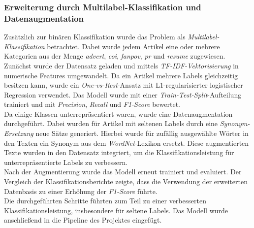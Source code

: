 \subsubsection{Erweiterung durch Multilabel-Klassifikation und Datenaugmentation}
Zusätzlich zur binären Klassifikation wurde das Problem als \textit{Multilabel-Klassifikation} betrachtet. Dabei wurde jedem Artikel eine oder mehrere Kategorien aus der Menge \textit{advert}, \textit{coi}, \textit{fanpov}, \textit{pr} und \textit{resume} zugewiesen. \\
Zunächst wurde der Datensatz geladen und mittels \textit{TF-IDF-Vektorisierung} in numerische Features umgewandelt. Da ein Artikel mehrere Labels gleichzeitig besitzen kann, wurde ein \textit{One-vs-Rest}-Ansatz mit L1-regularisierter logistischer Regression verwendet. Das Modell wurde mit einer \textit{Train-Test-Split}-Aufteilung trainiert und mit \textit{Precision}, \textit{Recall} und \textit{F1-Score} bewertet.\\
Da einige Klassen unterrepräsentiert waren, wurde eine Datenaugmentation durchgeführt. Dabei wurden für Artikel mit seltenen Labels durch eine \textit{Synonym-Ersetzung} neue Sätze generiert. Hierbei wurde für zufällig ausgewählte Wörter in den Texten ein Synonym aus dem \textit{WordNet}-Lexikon ersetzt. Diese augmentierten Texte wurden in den Datensatz integriert, um die Klassifikationsleistung für unterrepräsentierte Labels zu verbessern.\\
Nach der Augmentierung wurde das Modell erneut trainiert und evaluiert. Der Vergleich der Klassifikationsberichte zeigte, dass die Verwendung der erweiterten Datenbasis zu einer Erhöhung der \textit{F1-Score} führte.\\
Die durchgeführten Schritte führten zum Teil zu einer verbesserten Klassifikationsleistung, insbesondere für seltene Labels. Das Modell wurde anschließend in die Pipeline des Projektes eingefügt.

